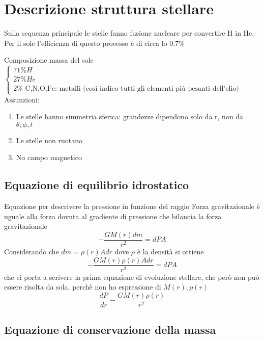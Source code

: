 \section{Descrizione struttura stellare}

Sulla sequenza principale le stelle fanno fusione nucleare per convertire H in He. Per il sole l'efficienza di questo processo è di circa lo $0.7\%$ 

\noindent Composizione massa del sole $\begin{cases}
    71 \% H \\
    27 \% He \\
    2 \% \text{ C,N,O,Fe: metalli (così indico tutti gli elementi più pesanti dell'elio)}
\end{cases}$ 
Assunzioni:
\begin{enumerate}
    \item Le stelle hanno simmetria sferica: grandezze dipendono solo da r, non da $\theta,\phi,t$
    \item Le stelle non ruotano
    \item No campo magnetico
\end{enumerate}

\subsection{Equazione di equilibrio idrostatico}

Equazione per descrivere la pressione in funzione del raggio \newline
Forza gravitazionale è uguale alla forza dovuta al gradiente di pressione che bilancia la forza gravitazionale
\begin{equation*}
    -\frac{GM(r)dm}{r^2} = dP A
\end{equation*}
Considerando che $dm = \rho(r)A dr$ dove $\rho$ è la densità si ottiene
\begin{equation}
    -\frac{GM(r)\rho(r)A dr}{r^2} = dP A
\end{equation}
che ci porta a scrivere la prima equazione di evoluzione stellare, che però non può essere risolta da sola, perchè non ho espressione di $M(r), \rho(r)$
\begin{equation*}
   \frac{dP}{dr} -\frac{GM(r)\rho(r)}{r^2}
\end{equation*}

\subsection{Equazione di conservazione della massa}


